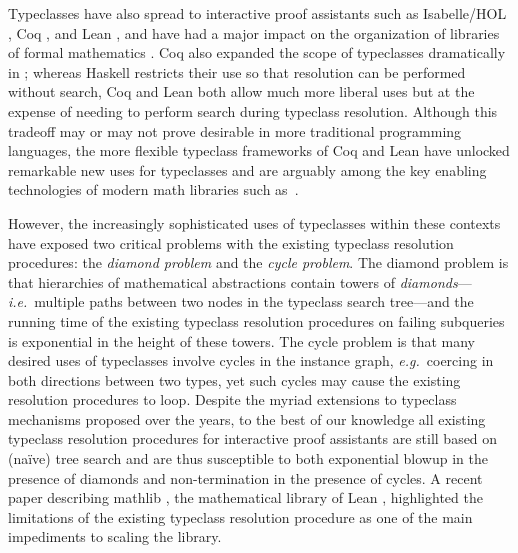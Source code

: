 \documentclass[runningheads]{llncs}
\newcommand\ie{\emph{i.e.}\ }
\newcommand\eg{\emph{e.g.}\ }
\begin{document}
Typeclasses have also spread to interactive proof assistants such as Isabelle/HOL \cite{nipkow2002isabelle}, Coq \cite{coqv891,sozeau2008first}, and Lean \cite{de2015lean},
and have had a major impact on the organization of libraries of formal mathematics \cite{paulson2004organizing,spitters2010developing,spitters2011type,krebbers2011type,holzl2013type,2019arXiv191009336M}.
Coq also expanded the scope of typeclasses dramatically in \cite{sozeau2008first};
whereas Haskell restricts their use so that resolution can be performed without search,
Coq and Lean both allow much more liberal uses
but at the expense of needing to perform search during typeclass resolution.
Although this tradeoff may or may not prove desirable in more traditional programming languages,
the more flexible typeclass frameworks of Coq and Lean have unlocked remarkable new uses
for typeclasses and are arguably among the key enabling technologies of modern math libraries
such as~\cite{2019arXiv191009336M}.

However, the increasingly sophisticated uses of typeclasses within these contexts have exposed two critical problems with the existing typeclass resolution procedures:
the \emph{diamond problem} and the \emph{cycle problem}.
The diamond problem is that hierarchies of mathematical abstractions contain towers of \emph{diamonds}---\ie multiple paths between
two nodes in the typeclass search tree---and the running time of the existing typeclass resolution procedures on failing subqueries is
exponential in the height of these towers.
The cycle problem is that many desired uses of typeclasses involve cycles in the instance graph, \eg coercing in both directions between two types,
yet such cycles may cause the existing resolution procedures to loop.
Despite the myriad extensions to typeclass mechanisms proposed over the years,
to the best of our knowledge all existing typeclass resolution procedures for interactive proof assistants
are still based on (na\"{i}ve) tree search and are thus susceptible to both exponential blowup in the presence of diamonds and non-termination in the presence of cycles.
A recent paper describing \textsf{mathlib} \cite{2019arXiv191009336M}, the mathematical library of Lean \cite{de2015lean}, highlighted the limitations of the
existing typeclass resolution procedure as one of the main impediments to scaling the library.
\end{document}
